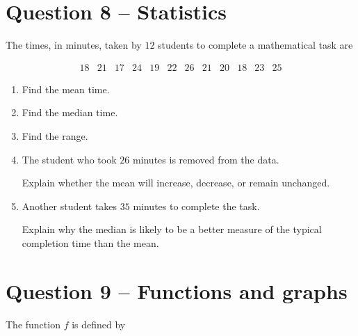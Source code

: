 	\newpage
	
	\section*{Question 8 -- Statistics }
	
	The times, in minutes, taken by \(12\) students to complete a mathematical task are
	
	\[
	\begin{array}{cccccccccccc}
		18 & 21 & 17 & 24 & 19 & 22 &
		26 & 21 & 20 & 18 & 23 & 25
	\end{array}
	\]
	
	\begin{enumerate}
		
		\item[(a)]
		Find the mean time.
		
		\vspace{20mm}
		
		\item[(b)]
		Find the median time.
		
		\vspace{20mm}
		
		\item[(c)]
		Find the range.
		
		\vspace{15mm}
		
		\item[(d)]
		The student who took \(26\) minutes is removed from the data.
		
		Explain whether the mean will increase, decrease, or remain unchanged.
		
		\vspace{20mm}
		
		\item[(e)]
		Another student takes \(35\) minutes to complete the task.
		
		Explain why the median is likely to be a better measure of the typical completion time than the mean.
		
	\end{enumerate}
	
	\newpage
	
	\section*{Question 9 -- Functions and graphs }
	
	The function \(f\) is defined by
	
